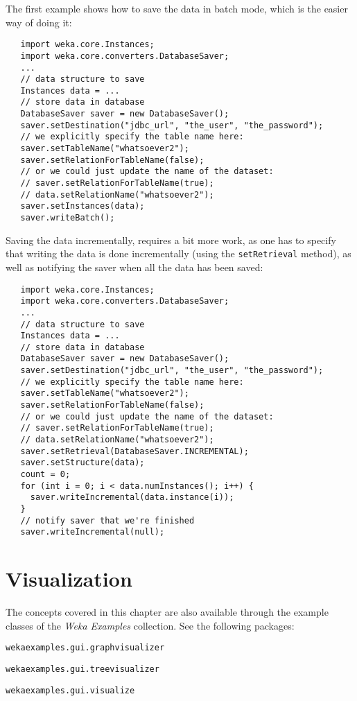 The first example shows how to save the data in batch mode, which is the easier
way of doing it:
\begin{verbatim}
   import weka.core.Instances;
   import weka.core.converters.DatabaseSaver;
   ...
   // data structure to save
   Instances data = ...
   // store data in database
   DatabaseSaver saver = new DatabaseSaver();
   saver.setDestination("jdbc_url", "the_user", "the_password");
   // we explicitly specify the table name here:
   saver.setTableName("whatsoever2");
   saver.setRelationForTableName(false);
   // or we could just update the name of the dataset:
   // saver.setRelationForTableName(true);
   // data.setRelationName("whatsoever2");
   saver.setInstances(data);
   saver.writeBatch();
\end{verbatim}
Saving the data incrementally, requires a bit more work, as one has to specify
that writing the data is done incrementally (using the \texttt{setRetrieval}
method), as well as notifying the saver when all the data has been saved:
\begin{verbatim}
   import weka.core.Instances;
   import weka.core.converters.DatabaseSaver;
   ...
   // data structure to save
   Instances data = ...
   // store data in database
   DatabaseSaver saver = new DatabaseSaver();
   saver.setDestination("jdbc_url", "the_user", "the_password");
   // we explicitly specify the table name here:
   saver.setTableName("whatsoever2");
   saver.setRelationForTableName(false);
   // or we could just update the name of the dataset:
   // saver.setRelationForTableName(true);
   // data.setRelationName("whatsoever2");
   saver.setRetrieval(DatabaseSaver.INCREMENTAL);
   saver.setStructure(data);
   count = 0;
   for (int i = 0; i < data.numInstances(); i++) {
     saver.writeIncremental(data.instance(i));
   }
   // notify saver that we're finished
   saver.writeIncremental(null);
\end{verbatim}

\newpage

\section{Visualization}
\label{api_visualization}
The concepts covered in this chapter are also available through the example
classes of the \textit{Weka Examples} collection\cite{wekaexamples}. See the
following packages:
\begin{tight_itemize}
	\item \texttt{wekaexamples.gui.graphvisualizer}
	\item \texttt{wekaexamples.gui.treevisualizer}
	\item \texttt{wekaexamples.gui.visualize}
\end{tight_itemize}

